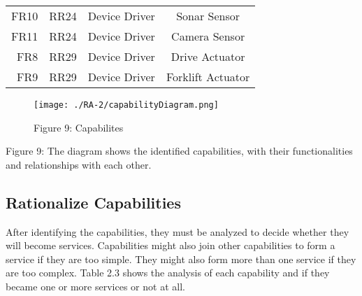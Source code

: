 {\begin{tabular}{| r | p{2cm} | c | c |}
	\hline
	FR10 & RR24 & Device Driver & Sonar Sensor\\
	FR11 & RR24 & Device Driver & Camera Sensor\\
	FR8 & RR29 & Device Driver & Drive Actuator\\
	FR9 & RR29 & Device Driver & Forklift Actuator\\
 	\hline
\end{tabular}
}

\begin{figure}[ht!]
 \centering
 \texttt{[image: ./RA-2/capabilityDiagram.png]}
 \caption{Figure 9: Capabilites}
 \label{fig:capabilities}
\end{figure}

Figure 9: The diagram shows the identified capabilities, with their functionalities and relationships with each other.

\subsection{Rationalize Capabilities}
After identifying the capabilities, they must be analyzed to decide whether they will become services. Capabilities might also join other capabilities to form a service if they are too simple. They might also form more than one service if they are too complex. Table 2.3 shows the analysis of each capability and if they became one or more services or not at all.

